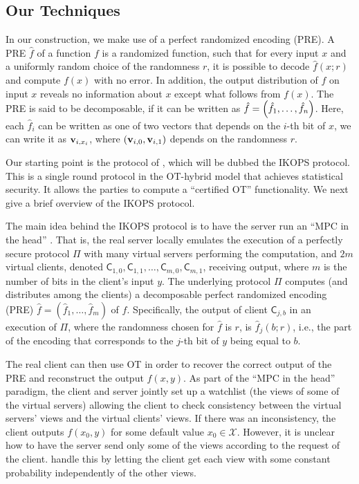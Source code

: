 \documentclass{llncs}
\newcommand{\enote}[1]{\authnote{Eran}{#1}}
\newcommand{\X}{\mathcal{X}}
\renewcommand{\v}{\myvec{v}}
\newcommand{\Cc}{\mathsf{C}}
\begin{document}
\subsection{Our Techniques}
In our construction, we make use of a perfect randomized encoding (PRE). A PRE $\hat{f}$  of a function $f$ \cite{AIK04} is a randomized function, such that for every input $x$ and a uniformly random choice of the randomness $r$, it is possible to decode $\hat{f}(x;r)$ and compute $f(x)$ with no error. In addition, the output distribution of $\hat{f}$ on input $x$ reveals no information about $x$ except what follows from $f(x)$. The PRE is said to be decomposable, if it can be written as $\hat{f}=\left ( \hat{f}_1,\ldots,\hat{f}_n \right )$. Here, each $\hat{f}_i$ can be written as one of two vectors that depends on the $i$-th bit of $x$, \ie we can write it as $\v_{i,x_i}$, where $(\v_{i,0},\v_{i,1})$ depends on the randomness $r$.



Our starting point is the protocol of \citet{IKOPS11}, which will be dubbed the IKOPS protocol. This is a  single round protocol in the OT-hybrid model that achieves statistical security. It allows the parties to compute a ``certified OT'' functionality. We next give a brief overview of the IKOPS protocol. 

The main idea behind the IKOPS protocol is to have the server run an ``MPC in the head'' \cite{IPS08} \enote{give citation}. That is, the real server locally emulates the execution of a perfectly secure protocol $\Pi$ with many virtual servers performing the computation, and $2m$ virtual clients, denoted $\Cc_{1,0},\Cc_{1,1},\ldots,\Cc_{m,0},\Cc_{m,1}$, receiving output, where $m$ is the number of bits in the client's input $y$. The underlying protocol $\Pi$  computes (and distributes among the clients) a decomposable perfect randomized encoding (PRE) $\hat{f} = (\hat{f}_1,\ldots,\hat{f}_m)$ of $f$. Specifically, the output of client $\Cc_{j,b}$ in an execution of $\Pi$, where the randomness chosen for $\hat{f}$ is $r$, is $\hat{f}_j(b;r)$, i.e., the part of the encoding that corresponds to the $j$-th bit of $y$ being equal to $b$. 

The real client can then use OT in order to recover the correct output of the PRE and reconstruct the output $f(x,y)$. As part of the ``MPC in the head'' paradigm, the client and server jointly set up a watchlist (the views of some of the virtual servers) allowing the client to check consistency between the virtual servers' views and the virtual clients' views. If there was an inconsistency, the client outputs $f(x_0,y)$ for some default value $x_0\in\X$. However, it is unclear how to have the server send only some of the views according to the request of the client. \citet{IKOPS11} handle this by letting the client get each view with some constant probability independently of the other views.
\end{document}
